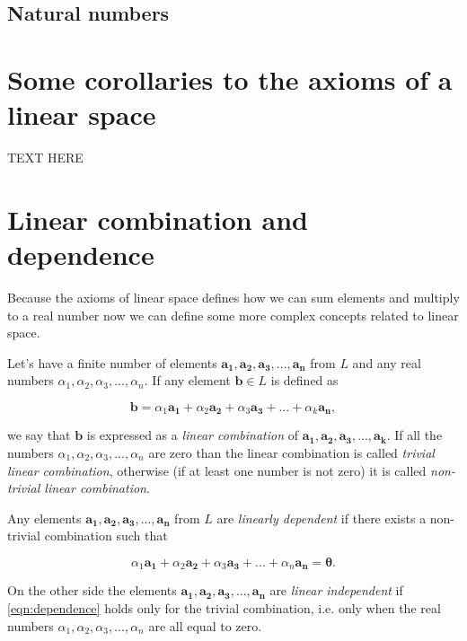 \documentclass{book}
\begin{document}
\subsection{Natural numbers}

\section {Some corollaries to the axioms of a linear space}

TEXT HERE

\section{Linear combination and dependence}

Because the axioms of linear space defines how we can sum elements and multiply to a real number now we can define some more complex concepts related to linear space. 

Let's have a finite number of elements $\boldsymbol{a_1}, \boldsymbol{a_2}, \boldsymbol{a_3},..., \boldsymbol{a_n}$ from $L$ and any real numbers $\alpha_1, \alpha_2, \alpha_3,..., \alpha_n$. If any element $\boldsymbol{b} \in L$ is defined as

\[\boldsymbol{b} = \alpha_1\boldsymbol{a_1} + \alpha_2\boldsymbol{a_2} + \alpha_3\boldsymbol{a_3} + ... + \alpha_k\boldsymbol{a_n},\]

we say that $\boldsymbol{b}$ is expressed as a \emph{linear combination} of $\boldsymbol{a_1}, \boldsymbol{a_2}, \boldsymbol{a_3},..., \boldsymbol{a_k}$. If all the numbers $\alpha_1, \alpha_2, \alpha_3,..., \alpha_n$ are zero than the linear combination is called \emph{trivial linear combination}, otherwise (if at least one number is not zero) it is called \emph{non-trivial linear combination}.

Any elements $\boldsymbol{a_1}, \boldsymbol{a_2}, \boldsymbol{a_3},..., \boldsymbol{a_n}$ from $L$ are \emph{linearly dependent} if there exists a non-trivial combination such that

\begin{equation}
\label{eqn:dependence}
\alpha_1\boldsymbol{a_1} + \alpha_2\boldsymbol{a_2} + \alpha_3\boldsymbol{a_3} + ... + \alpha_n\boldsymbol{a_n} = \boldsymbol{\theta}.
\end{equation}

On the other side the elements $\boldsymbol{a_1}, \boldsymbol{a_2}, \boldsymbol{a_3},..., \boldsymbol{a_n}$ are \emph{linear independent} if \eqref{eqn:dependence} holds only for the trivial combination, i.e. only when the real numbers $\alpha_1, \alpha_2, \alpha_3,..., \alpha_n$ are all equal to zero.
\end{document}
